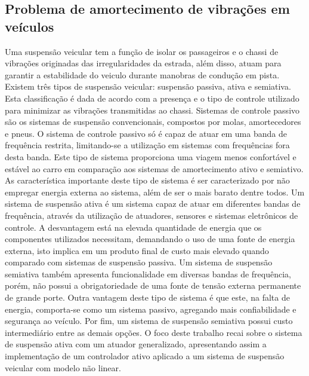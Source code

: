 \subsection{Problema de amortecimento de vibrações em veículos}
Uma suspensão veicular tem a função de isolar os passageiros e o chassi de vibrações originadas das irregularidades da estrada, além disso, atuam para garantir a estabilidade do veiculo durante manobras de condução em pista.
Existem três tipos de suspensão veicular: suspensão passiva, ativa e semiativa. Esta classificação é dada de acordo com a presença e o tipo de controle utilizado para minimizar as vibrações transmitidas ao chassi.
Sistemas de controle passivo são os sistemas de suspensão convencionais, compostos por molas, amortecedores e pneus. O sistema de controle passivo só é capaz de atuar em uma banda de frequência restrita, limitando-se a utilização em sistemas com frequências fora desta banda. Este tipo de sistema proporciona uma viagem menos confortável e estável ao carro em comparação aos sistemas de amortecimento ativo e semiativo. As característica importante deste tipo de sistema é ser caracterizado por não empregar energia externa ao sistema, além de ser o mais barato dentre todos.
Um sistema de suspensão ativa é um sistema capaz de atuar em diferentes bandas de frequência, através da utilização de atuadores, sensores e sistemas eletrônicos de controle. A desvantagem está na elevada quantidade de energia que os componentes utilizados necessitam, demandando o uso de uma fonte de energia externa, isto implica em um produto final de custo mais elevado quando comparado com sistemas de suspensão passiva.
Um sistema de suspensão semiativa também apresenta funcionalidade em diversas bandas de frequência, porém, não possui a obrigatoriedade de uma fonte de tensão externa permanente de grande porte. Outra vantagem deste tipo de sistema é que este, na falta de energia, comporta-se como um sistema passivo, agregando mais confiabilidade e segurança ao veículo. Por fim, um sistema de suspensão semiativa possui custo intermediário entre as demais opções.
O foco deste trabalho recai sobre o sistema de suspensão ativa com um atuador generalizado, apresentando assim a implementação de um controlador ativo aplicado a um sistema de suspensão veicular com modelo não linear.
